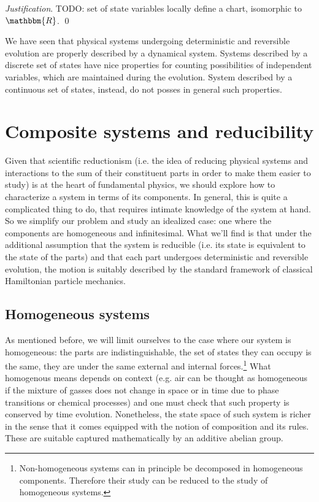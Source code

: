 \documentclass[aps,pra,10pt,twocolumn,floatfix,nofootinbib]{revtex4-1}
\theoremstyle{definition}
\newenvironment{justification}{\emph{Justification}.}{\qed}
\begin{document}
\begin{justification}
TODO: set of state variables locally define a chart, isomorphic to $\mathbbm{R}$.
\end{justification}

We have seen that physical systems undergoing deterministic and reversible evolution are properly described by a dynamical system. Systems described by a discrete set of states have nice properties for counting possibilities of independent variables, which are maintained during the evolution. System described by a continuous set of states, instead, do not posses in general such properties.

\section{Composite systems and reducibility}



Given that scientific reductionism (i.e. the idea of reducing physical systems and interactions to the sum of their constituent parts in order to make them easier to study) is at the heart of fundamental physics, we should explore how to characterize a system in terms of its components. In general, this is quite a complicated thing to do, that requires intimate knowledge of the system at hand. So we simplify our problem and study an idealized case: one where the components are homogeneous and infinitesimal. What we'll find is that under the additional assumption that the system is reducible (i.e. its state is equivalent to the state of the parts) and that each part undergoes deterministic and reversible evolution, the motion is suitably described by the standard framework of classical Hamiltonian particle mechanics.

\subsection{Homogeneous systems}
As mentioned before, we will limit ourselves to the case where our system is homogeneous: the parts are indistinguishable, the set of states they can occupy is the same, they are under the same external and internal forces.\footnote{Non-homogeneous systems can in principle be decomposed in homogeneous components. Therefore their study can be reduced to the study of homogeneous systems.} What homogenous means depends on context (e.g. air can be thought as homogeneous if the mixture of gasses does not change in space or in time due to phase transitions or chemical processes) and one must check that such property is conserved by time evolution. Nonetheless, the state space of such system is richer in the sense that it comes equipped with the notion of composition and its rules. These are suitable captured mathematically by an additive abelian group.
\end{document}
